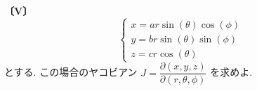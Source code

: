 \noindent\textbf{〔V〕}
\[
\begin{cases}
x=a r\sin(\theta)\cos(\phi)\\
y=b r\sin(\theta)\sin(\phi)\\
z=c r\cos(\theta)
\end{cases}
\]
とする. この場合のヤコビアン
$J=\dfrac{\partial(x,y,z)}{\partial(r,\theta,\phi)}$ を求めよ.
